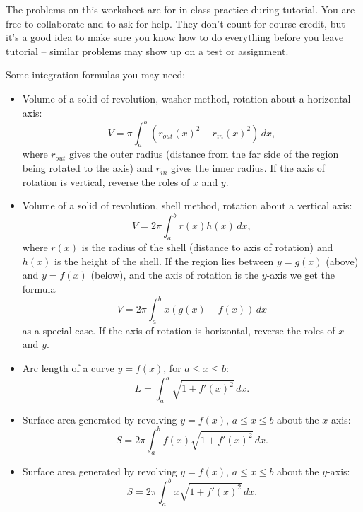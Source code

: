 \documentclass[12pt]{article}
\begin{document}
\thispagestyle{fancy}
The problems on this worksheet are for in-class practice during tutorial. You are free to collaborate and to ask for help. They don't count for course credit, but it's a good idea to make sure you know how to do everything before you leave tutorial -- similar problems may show up on a test or assignment.

\bigskip

Some integration formulas you may need:

\begin{itemize}
 \item Volume of a solid of revolution, washer method, rotation about a horizontal axis: 
\[
 V = \pi\int_a^b (r_{out}(x)^2-r_{in}(x)^2)\,dx,
\]
where $r_{out}$ gives the outer radius (distance from the far side of the region being rotated to the axis) and $r_{in}$ gives the inner radius. If the axis of rotation is vertical, reverse the roles of $x$ and $y$.



 \item Volume of a solid of revolution, shell method, rotation about a vertical axis:
\[
 V = 2\pi\int_a^b r(x)h(x)\,dx,
\]
where $r(x)$ is the radius of the shell (distance to axis of rotation) and $h(x)$ is the height of the shell. If the region lies between $y=g(x)$ (above) and $y=f(x)$ (below), and the axis of rotation is the $y$-axis we get the formula
\[
 V = 2\pi \int_a^b x(g(x)-f(x))\,dx
\]
as a special case. If the axis of rotation is horizontal, reverse the roles of $x$ and $y$.

\item Arc length of a curve $y=f(x)$, for $a\leq x\leq b$:
\[
 L = \int_a^b\sqrt{1+f'(x)^2}\,dx.
\]
\item Surface area generated by revolving $y=f(x)$, $a\leq x\leq b$ about the $x$-axis:
\[
 S = 2\pi\int_a^b f(x)\sqrt{1+f'(x)^2}\,dx.
\]
\item Surface area generated by revolving $y=f(x)$, $a\leq x\leq b$ about the $y$-axis:
\[
 S = 2\pi\int_a^b x\sqrt{1+f'(x)^2}\,dx.
\]

\end{itemize}
\end{document}
